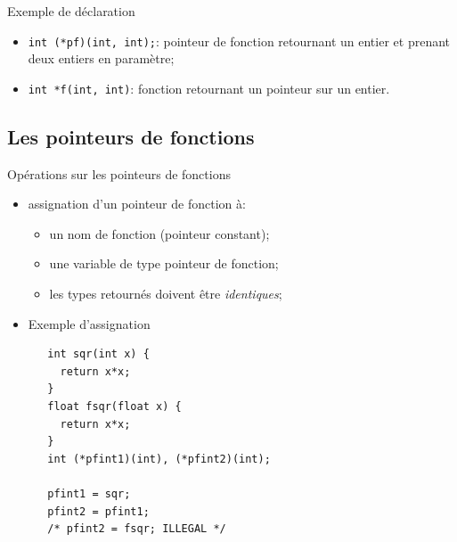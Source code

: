 \begin{frame}
 Exemple de d\'eclaration 
  \begin{itemize}
    \item {\tt int (*pf)(int, int);}: pointeur de fonction retournant
      un entier et prenant deux entiers en param\`etre;
  \item {\tt int *f(int, int)}: fonction retournant un pointeur
    sur un entier.
  \end{itemize}


\end{frame}

\begin{frame}

\section{Les pointeurs de fonctions}


 Op\'erations sur les pointeurs de fonctions
\begin{itemize}
  \item assignation d'un pointeur de fonction \`a:
    \begin{itemize}
      \item un nom de fonction (pointeur constant);
      \item une variable de type pointeur de fonction;
      \item les types retourn\'es doivent \^etre {\em identiques};
    \end{itemize}
  \item Exemple d'assignation
{\normalsize
\begin{verbatim}
   int sqr(int x) {
     return x*x;
   }
   float fsqr(float x) {
     return x*x;
   }
   int (*pfint1)(int), (*pfint2)(int);

   pfint1 = sqr;
   pfint2 = pfint1;
   /* pfint2 = fsqr; ILLEGAL */
\end{verbatim}
}

\end{itemize}
\end{frame}

